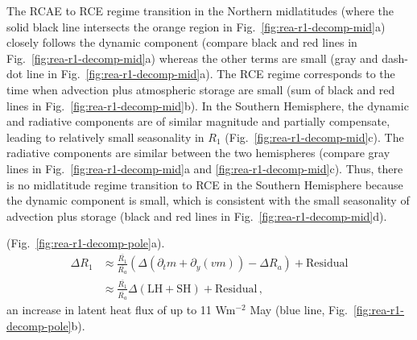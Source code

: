 \documentclass{ametsocV5}
\begin{document}
    The RCAE to RCE regime transition in the Northern midlatitudes (where the solid black line intersects the orange region in Fig.~\ref{fig:rea-r1-decomp-mid}a) closely follows the dynamic component (compare black and red lines in Fig.~\ref{fig:rea-r1-decomp-mid}a) whereas the other terms are small (gray and dash-dot line in Fig.~\ref{fig:rea-r1-decomp-mid}a). The RCE regime corresponds to the time when advection plus atmospheric storage are small (sum of black and red lines in Fig.~\ref{fig:rea-r1-decomp-mid}b). In the Southern Hemisphere, the dynamic and radiative components are of similar magnitude and partially compensate, leading to relatively small seasonality in $R_1$ (Fig.~\ref{fig:rea-r1-decomp-mid}c). The radiative components are similar between the two hemispheres (compare gray lines in Fig.~\ref{fig:rea-r1-decomp-mid}a and \ref{fig:rea-r1-decomp-mid}c). Thus, there is no midlatitude regime transition to RCE in the Southern Hemisphere because the dynamic component is small, which is consistent with the small seasonality of advection plus storage (black and red lines in Fig.~\ref{fig:rea-r1-decomp-mid}d).

     (Fig.~\ref{fig:rea-r1-decomp-pole}a).
    \begin{align}
      \Delta R_1 &\approx \frac{\overline{R_1}}{\overline{R_a}}\left( \Delta(\partial_t m + \partial_y (vm))  - \Delta R_a \right) + \mathrm{Residual} \\
      &\approx \frac{\overline{R_1}}{\overline{R_a}}\Delta(\mathrm{LH+SH}) + \mathrm{Residual} \, ,
    \end{align}
     an increase in latent heat flux of up to 11 Wm$^{-2}$  May  (blue line, Fig.~\ref{fig:rea-r1-decomp-pole}b). 
    
\end{document}
